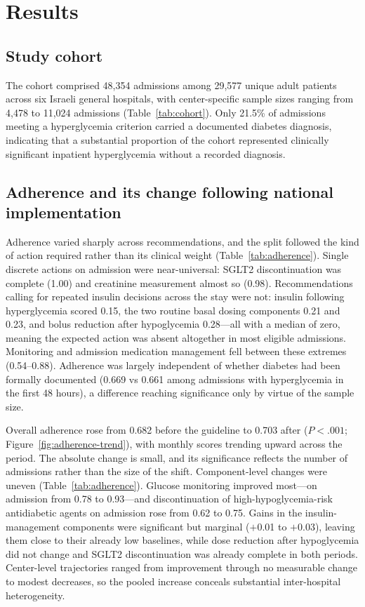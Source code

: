\section{Results}
\label{sec:results}

\subsection{Study cohort}

The cohort comprised 48,354 admissions among 29,577 unique adult patients
across six Israeli general hospitals, with center-specific sample sizes ranging
from 4,478 to 11,024 admissions (Table~\ref{tab:cohort}). Only 21.5\% of
admissions meeting a hyperglycemia criterion carried a documented diabetes
diagnosis, indicating that a substantial proportion of the cohort represented
clinically significant inpatient hyperglycemia without a recorded diagnosis.

\subsection{Adherence and its change following national implementation}
\label{sec:adherence-results}

Adherence varied sharply across recommendations, and the split followed the
kind of action required rather than its clinical weight
(Table~\ref{tab:adherence}). Single discrete actions on admission were
near-universal: SGLT2 discontinuation was complete (1.00) and creatinine
measurement almost so (0.98). Recommendations calling for repeated insulin
decisions across the stay were not: insulin following hyperglycemia scored 0.15, the
two routine basal dosing components 0.21 and 0.23, and bolus reduction after
hypoglycemia 0.28---all with a median of zero, meaning the expected action
was absent altogether in most eligible admissions. Monitoring and admission
medication management fell between these extremes (0.54--0.88). Adherence was
largely independent of whether diabetes had been formally documented (0.669 vs
0.661 among admissions with hyperglycemia in the first 48 hours), a difference
reaching significance only by virtue of the sample size.

Overall adherence rose from 0.682 before the guideline to 0.703 after
($P<.001$; Figure~\ref{fig:adherence-trend}), with monthly scores trending
upward across the period. The absolute change is small, and its significance
reflects the number of admissions rather than the size of the shift.
Component-level changes were uneven (Table~\ref{tab:adherence}). Glucose
monitoring improved most---on admission from 0.78 to 0.93---and discontinuation
of high-hypoglycemia-risk antidiabetic agents on admission rose from 0.62 to
0.75. Gains in the insulin-management components were significant but marginal
($+$0.01 to $+$0.03), leaving them close to their already low baselines, while
dose reduction after hypoglycemia did not change and SGLT2 discontinuation was
already complete in both periods. Center-level trajectories ranged from
improvement through no measurable change to modest decreases, so the pooled
increase conceals substantial inter-hospital heterogeneity.

